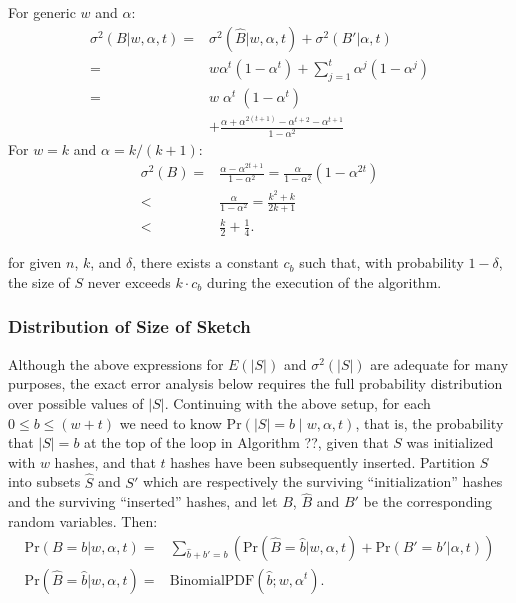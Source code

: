 \documentclass{sig-alternate}
\begin{document}
For generic $w$ and $\alpha$:
\begin{align}
\sigma^2(B|w,\alpha,t) = & \sigma^2(\hat{B}|w,\alpha,t) + \sigma^2(B'|\alpha,t) \\
                       = & w \alpha^t (1 - \alpha^t) + \sum_{j=1}^{t} \alpha^j (1\! -\! \alpha^j) \\
                       = & w \;\alpha^t \;(1 - \alpha^t) \\
                         & + \frac{\alpha + \alpha^{2(t+1)} - \alpha^{t+2} - \alpha^{t+1}}{1 - \alpha^2}
\end{align}
For $w=k$ and $\alpha=k/(k+1)$:
\begin{align}
\sigma^2(B) = & \frac{\alpha - \alpha^{2t+1}}{1 - \alpha^2} = \frac{\alpha}{1-\alpha^2}(1-\alpha^{2t}) \\
            < & \frac{\alpha}{1-\alpha^2} = \frac{k^2+k}{2k+1} \\
            < & \frac{k}{2} + \frac{1}{4}.
\end{align}

 for given $n$, $k$, and $\delta$, there exists a constant $c_b$ such that, with probability $1-\delta$,
the size of $S$ never exceeds $k \cdot c_b$ during the execution of the algorithm.

\subsubsection{Distribution of Size of Sketch}

Although the above expressions for $E(|S|)$ and $\sigma^2(|S|)$ are adequate for many purposes,
the exact error analysis below requires the full probability distribution over possible values of $|S|$.
Continuing with the above setup, for each $0 \le b \le (w+t)$
we need to know $\mathrm{Pr}(|S| = b \;|\; w, \alpha, t)$, that is, the probability that $|S| = b$ at the top of the
loop in Algorithm ??, given that $S$ was initialized with $w$ hashes, and that $t$ hashes have been subsequently inserted.
Partition $S$ into subsets $\hat{S}$ and $S'$ which are respectively the surviving ``initialization'' hashes and the surviving ``inserted'' hashes,
and let $B$, $\hat{B}$ and $B'$ be the corresponding random variables. Then:
\begin{align}
\mathrm{Pr}(B\!=\!b | w, \alpha, t)  = & \sum_{\hat{b}+b'=b} \left( \mathrm{Pr}(\hat{B}\!=\! \hat{b} | w, \alpha, t) + \mathrm{Pr}(B'\!=\! b'| \alpha, t) \right)\\
\mathrm{Pr}(\hat{B}\!=\! \hat{b} | w, \alpha, t) = & \mathrm{BinomialPDF}(\hat{b}; w,\alpha^t).
\end{align}
\end{document}
